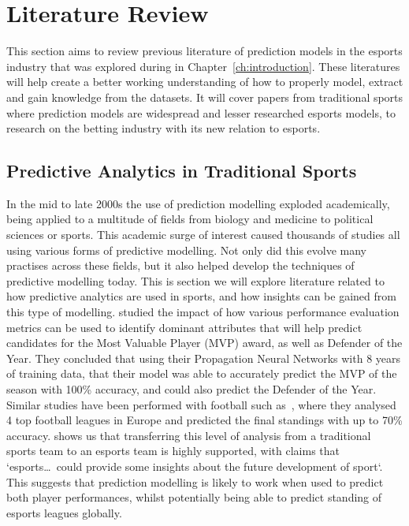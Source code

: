 \chapter{Literature Review}\label{ch:literaturereview}
This section aims to review previous literature of prediction models in the esports industry that was explored during in Chapter~\ref{ch:introduction}.
These literatures will help create a better working understanding of how to properly model, extract and gain knowledge from the datasets.
It will cover papers from traditional sports where prediction models are widespread and lesser researched esports models, to research on the betting industry with its new relation to esports.

\section{Predictive Analytics in Traditional Sports}\label{sec:TradSports}
In the mid to late 2000s the use of prediction modelling exploded academically, being applied to a multitude of fields from biology and medicine to political sciences or sports.
This academic surge of interest caused thousands of studies all using various forms of predictive modelling.
Not only did this evolve many practises across these fields, but it also helped develop the techniques of predictive modelling today.
This is section we will explore literature related to how predictive analytics are used in sports, and how insights can be gained from this type of modelling.
\citet{sarlis2020sports} studied the impact of how various performance evaluation metrics can be used to identify dominant attributes that will help predict candidates for the Most Valuable Player (MVP) award, as well as Defender of the Year.
They concluded that using their Propagation Neural Networks with 8 years of training data, that their model was able to accurately predict the MVP of the season with 100\% accuracy, and could also predict the Defender of the Year.
Similar studies have been performed with football such as~\citet{pantzalis2020sports}, where they analysed 4 top football leagues in Europe and predicted the final standings with up to 70\% accuracy.
\citet{scelles2021peculiar} shows us that transferring this level of analysis from a traditional sports team to an esports team is highly supported, with claims that `esports\ldots~could provide some insights about the future development of sport`.
This suggests that prediction modelling is likely to work when used to predict both player performances, whilst potentially being able to predict standing of esports leagues globally. \\


